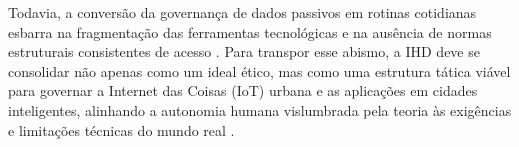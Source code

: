 \documentclass[
	12pt,				%
	oneside,			%
	a4paper,			%
	english,			%
	brazil				%
	]{abntex2ppgsi}
\begin{document}
    Todavia, a conversão da governança de dados passivos em rotinas cotidianas esbarra na fragmentação das ferramentas tecnológicas e na ausência de normas estruturais consistentes de acesso \cite{mu2024institutional}. Para transpor esse abismo, a IHD deve se consolidar não apenas como um ideal ético, mas como uma estrutura tática viável para governar a Internet das Coisas (IoT) urbana e as aplicações em cidades inteligentes, alinhando a autonomia humana vislumbrada pela teoria às exigências e limitações técnicas do mundo real \cite{DOWTHWAITE2024, DeBettio2023, Calvetti2021173}.
\end{document}
